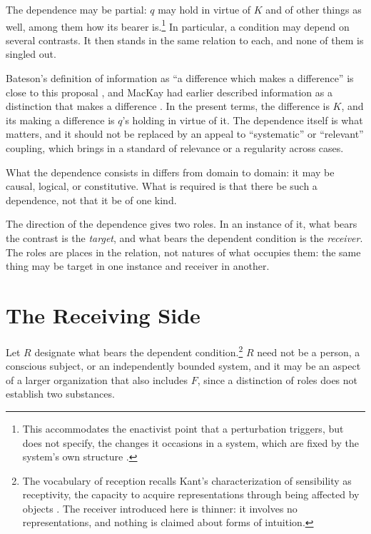 \documentclass[11pt,a4paper,oneside]{scrartcl}
\newcommand{\F}{\ensuremath{F}}
\newcommand{\R}{\ensuremath{R}}
\begin{document}
The dependence may be partial: $q$ may hold in virtue of $K$ and of other things as well, among them
how its bearer is.\footnote{This accommodates the enactivist point that a perturbation triggers,
but does not specify, the changes it occasions in a system, which are fixed by the system's own
structure \autocite{maturana1987}.} In particular, a condition may depend on several contrasts. It then
stands in the same relation to each, and none of them is singled out.

Bateson's definition of information as \enquote{a difference which makes a difference} is close to
this proposal \autocite{bateson1972}, and MacKay had earlier described information as a distinction
that makes a difference \autocite{mackay1969}. In the present terms, the difference is $K$, and its
making a difference is $q$'s holding in virtue of it. The dependence itself is what matters, and it
should not be replaced by an appeal to \enquote{systematic} or \enquote{relevant} coupling, which
brings in a standard of relevance or a regularity across cases.

What the dependence consists in differs from domain to domain: it may be causal, logical, or
constitutive. What is required is that there be such a dependence, not that it be of one kind.

The direction of the dependence gives two roles. In an instance of it, what bears the contrast is
the \emph{target}, and what bears the dependent condition is the \emph{receiver}. The roles are
places in the relation, not natures of what occupies them: the same thing may be target in one
instance and receiver in another.

\section{The Receiving Side}\label{sec:recv}

Let \R{} designate what bears the dependent condition.\footnote{The vocabulary of reception recalls
Kant's characterization of sensibility as receptivity, the capacity to acquire representations
through being affected by objects \autocite[A19/B33; cf.\ A50/B74]{kant1998}. The receiver
introduced here is thinner: it involves no representations, and nothing is claimed about forms of
intuition.} \R{} need not be a person, a conscious subject, or an independently bounded system, and it
may be an aspect of a larger organization that also includes \F, since a distinction of roles does
not establish two substances.
\end{document}
